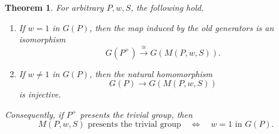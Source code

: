 \documentclass[10pt,a4paper]{amsart}
\newtheorem{theorem}{Theorem}
\begin{document}
	\begin{theorem}
		\label{thm:miller-tancer}
		For arbitrary $P,w,S$, the following hold.
		\begin{enumerate}[label=\textup{(\roman*)}]
			\item If $w=1$ in $G(P)$, then the map induced by the old generators is
			an isomorphism
			\[
			G(P^+)\xrightarrow{\ \cong\ }G(M(P,w,S)).
			\]
			\item If $w\ne1$ in $G(P)$, then the natural homomorphism
			\[
			G(P)\longrightarrow G(M(P,w,S))
			\]
			is injective.
		\end{enumerate}
		Consequently, if $P^+$ presents the trivial group, then
		\[
		M(P,w,S)\text{ presents the trivial group}
		\quad\Longleftrightarrow\quad
		w=1\text{ in }G(P).
		\]
	\end{theorem}
\end{document}

